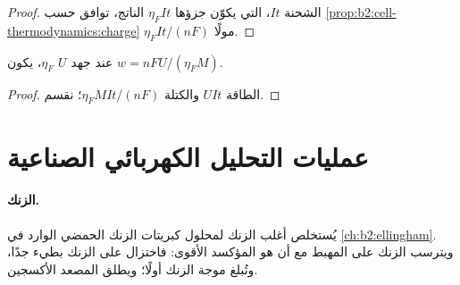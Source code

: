 \begin{proof}
الشحنة $It$، التي يكوّن جزؤها $\eta_F It$ الناتج، توافق حسب
\cref{prop:b2:cell-thermodynamics:charge} $\eta_F It/(nF)$ مولًا.
\end{proof}

\begin{proposition}\label{prop:b2:batteries-electrolysis:energy}
عند جهد $U$  $\eta_F$، يكون  $w = nFU/(\eta_F M)$.
\end{proposition}

\begin{proof}
الطاقة $UIt$ والكتلة $\eta_F MIt/(nF)$؛ نقسم.
\end{proof}

\section{عمليات التحليل الكهربائي الصناعية}

\paragraph{الزنك.} يُستخلص أغلب الزنك  لمحلول كبريتات الزنك
الحمضي الوارد في \cref{ch:b2:ellingham}. ويترسب الزنك على المهبط مع أن
 هو المؤكسد الأقوى: فاختزال  على الزنك بطيء جدًا،
وتُبلغ موجة الزنك أولًا؛ ويطلق المصعد الأكسجين.

